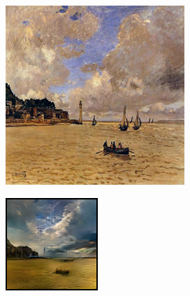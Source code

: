 \documentclass{article}
\begin{document}
\begin{figure}[H]
\begin{subfigure}{.112\textwidth}
    \end{subfigure}\hspace{.010\textwidth}%
    \begin{subfigure}{.112\textwidth}
        \centering
        \includegraphics[width=\linewidth]{00360.jpg}
    \end{subfigure}%
    \begin{subfigure}{.112\textwidth}
        \centering
        \includegraphics[width=\linewidth]{0034.png}
    \end{subfigure}
    

\end{figure}
\end{document}
